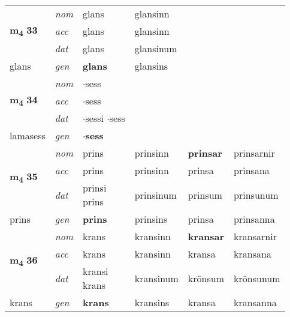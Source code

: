 \begin{longtable}[l]{llllll}
\multirow{3}{*}{{{\textbf{m{\textsubscript{4}}} \Large{\textbf{33}}}}}  & {\footnotesize{{\textit{nom}}}} & glans & glansinn    & \textbf{} &   \\*
 &  {\footnotesize{{\textit{acc}}}} & glans  & glansinn   &   &  \\*
 &  {\footnotesize{{\textit{dat}}}} & glans & glansinum   &  &  \\*
 {\footnotesize{glans}} &   {\footnotesize{{\textit{gen}}}} & \textbf{glans}  & glansins  &  &  \\
\cmidrule{1-6}


\multirow{3}{*}{{{\textbf{m{\textsubscript{4}}} \Large{\textbf{34}}}}}  & {\footnotesize{{\textit{nom}}}} & $\cdot$sess &     & \textbf{} &   \\*
 &  {\footnotesize{{\textit{acc}}}} & $\cdot$sess  &    &   &  \\*
 &  {\footnotesize{{\textit{dat}}}} & \specialcell{$\cdot$sessi\\  $\cdot$sess} &    &  &  \\*
 {\footnotesize{lamasess}} &   {\footnotesize{{\textit{gen}}}} & \textbf{$\cdot$sess}  &   &  &  \\
\cmidrule{1-6}


\multirow{3}{*}{{{\textbf{m{\textsubscript{4}}} \Large{\textbf{35}}}}}  & {\footnotesize{{\textit{nom}}}} & prins & prinsinn    & \textbf{prinsar} & prinsarnir  \\*
 &  {\footnotesize{{\textit{acc}}}} & prins  & prinsinn   & prinsa  & prinsana \\*
 &  {\footnotesize{{\textit{dat}}}} & \specialcell{prinsi\\ prins} & prinsinum   & prinsum & prinsunum \\*
 {\footnotesize{prins}} &   {\footnotesize{{\textit{gen}}}} & \textbf{prins}  & prinsins  & prinsa & prinsanna \\
\cmidrule{1-6}


\multirow{3}{*}{{{\textbf{m{\textsubscript{4}}} \Large{\textbf{36}}}}}  & {\footnotesize{{\textit{nom}}}} & krans & kransinn    & \textbf{kransar} & kransarnir  \\*
 &  {\footnotesize{{\textit{acc}}}} & krans  & kransinn   & kransa  & kransana \\*
 &  {\footnotesize{{\textit{dat}}}} & \specialcell{kransi\\ krans} & kransinum   & krönsum & krönsunum \\*
 {\footnotesize{krans}} &   {\footnotesize{{\textit{gen}}}} & \textbf{krans}  & kransins  & kransa & kransanna \\
\cmidrule{1-6}



\end{longtable}
